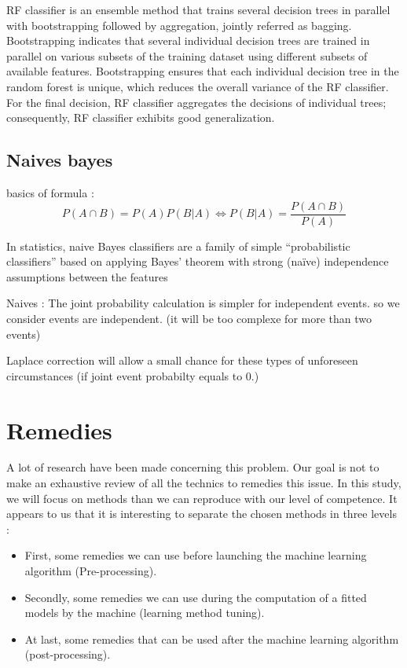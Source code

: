 \documentclass[
]{report}
\providecommand{\tightlist}{%
  \setlength{\itemsep}{0pt}\setlength{\parskip}{0pt}}
\begin{document}
RF classifier is an ensemble method that trains several decision trees in parallel with bootstrapping followed by aggregation, jointly referred as bagging. Bootstrapping indicates that several individual decision trees are trained in parallel on various subsets of the training dataset using different subsets of available features. Bootstrapping ensures that each individual decision tree in the random forest is unique, which reduces the overall variance of the RF classifier. For the final decision, RF classifier aggregates the decisions of individual trees; consequently, RF classifier exhibits good generalization.

\hypertarget{naives-bayes}{%
\section{Naives bayes}\label{naives-bayes}}

basics of formula : \[P(A ∩ B) = P(A) P(B|A) \iff P(B|A) = \frac{P(A ∩ B)}{P(A)}\]

In statistics, naive Bayes classifiers are a family of simple ``probabilistic classifiers'' based on applying Bayes' theorem with strong (naïve) independence assumptions between the features

Naives : The joint probability calculation is simpler for independent events. so we consider events are independent. (it will be too complexe for more than two events)

Laplace correction will allow a small chance for these types of unforeseen circumstances (if joint event probabilty equals to 0.)

\hypertarget{remedies}{%
\chapter{Remedies}\label{remedies}}

A lot of research have been made concerning this problem. Our goal is not to make an exhaustive review of all the technics to remedies this issue.
In this study, we will focus on methods than we can reproduce with our level of competence. It appears to us that it is interesting to separate the chosen methods in three levels :

\begin{itemize}
\tightlist
\item
  First, some remedies we can use before launching the machine learning algorithm (Pre-processing).
\item
  Secondly, some remedies we can use during the computation of a fitted models by the machine (learning method tuning).
\item
  At last, some remedies that can be used after the machine learning algorithm (post-processing).
\end{itemize}
\end{document}
